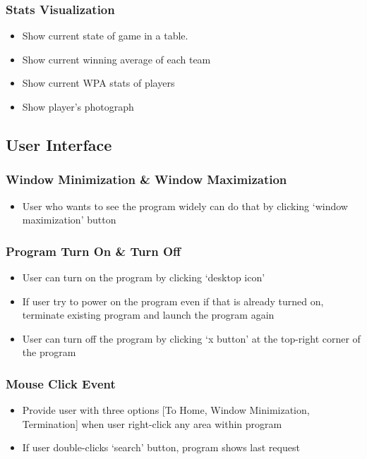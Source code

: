 \documentclass[conference,compsoc, twocolumn]{IEEEtran}
\begin{document}
\subsubsection{Stats Visualization}
\begin{itemize}
\item Show current state of game in a table.
\item Show current winning average of each team 
\item Show current WPA stats of players
\item Show player's photograph
\end{itemize}

\subsection{User Interface}


\subsubsection{Window Minimization \& Window Maximization}
\begin{itemize}
\item User who wants to see the program widely can do that by clicking ‘window maximization’ button
\end{itemize}

\subsubsection{Program Turn On \& Turn Off}
\begin{itemize}
\item User can turn on the program by clicking ‘desktop icon’ 
\item If user try to power on the program even if that is already turned on, terminate existing program and launch the program again
\item User can turn off the program by clicking ‘x button’ at the top-right corner of the program
\end{itemize}

\subsubsection{Mouse Click Event}
\begin{itemize}
\item Provide user with three options [To Home, Window Minimization, Termination] when user right-click any area within program
\item If user double-clicks ‘search’ button, program shows last request
\end{itemize}
\end{document}
